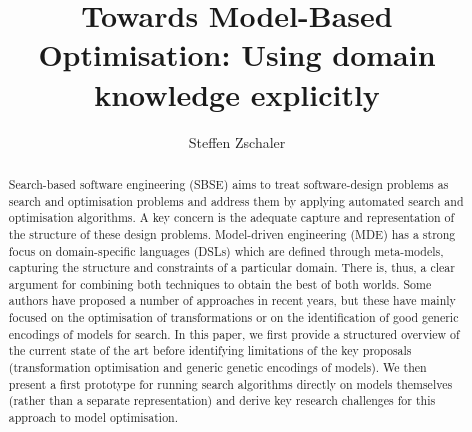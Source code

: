 \documentclass[draft]{llncs}
\title{Towards Model-Based Optimisation: Using domain knowledge explicitly}
\author{Steffen Zschaler\inst{1}}
\institute{
	Department of Informatics\\
	King's College London\\
	\email{szschaler@acm.org}
}
\begin{document}
	\maketitle
	
	\begin{abstract}
		Search-based software engineering (SBSE) aims to treat soft\-ware-design problems as search and optimisation problems and address them by applying automated
		search and optimisation algorithms. A key concern is the adequate capture and representation of the structure of these design problems. Model-driven
		engineering (MDE) has a strong focus on domain-specific languages (DSLs) which are defined through meta-models, capturing the structure and constraints of a
		particular domain. There is, thus, a clear argument for combining both techniques to obtain the best of both worlds. Some authors have proposed a number of
		approaches in recent years, but these have mainly focused on the optimisation of transformations or on the identification of good generic encodings of models
		for search.
		In this paper, we first provide a structured overview of the current state of the art before identifying limitations of the key proposals (transformation
		optimisation and generic genetic encodings of models). We then present a first prototype for running search algorithms directly on models themselves (rather
		than a separate representation) and derive key research challenges for this approach to model optimisation.
		
		
	\end{abstract}
	
	
	
	

	
	
		
	
	
	
		
	
	
	
	
\end{document}
